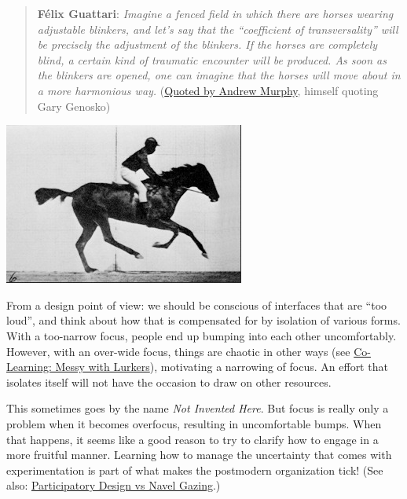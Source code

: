 \begin{quote}
\textbf{Félix Guattari}: \emph{Imagine a fenced field in which there are
horses wearing adjustable blinkers, and let's say that the ``coefficient
of transversality'' will be precisely the adjustment of the blinkers. If
the horses are completely blind, a certain kind of traumatic encounter
will be produced. As soon as the blinkers are opened, one can imagine
that the horses will move about in a more harmonious way.}
(\href{http://nine.fibreculturejournal.org/}{Quoted by Andrew Murphy},
himself quoting Gary Genosko)
\end{quote}

\begin{center}
\includegraphics[width=.85\textwidth]{../pictures/horse.jpg}
\end{center}

From a design point of view: we should be conscious of interfaces that
are ``too loud'', and think about how that is compensated for by
isolation of various forms. With a too-narrow focus, people end up
bumping into each other uncomfortably. However, with an over-wide focus,
things are chaotic in other ways (see
\href{http://peeragogy.org/practice/antipatterns/co-learning-messy-with-lurkers/}{Co-Learning:
Messy with Lurkers}), motivating a narrowing of focus. An effort that
isolates itself will not have the occasion to draw on other resources.

This sometimes goes by the name \emph{Not Invented Here}. But focus is
really only a problem when it becomes overfocus, resulting in
uncomfortable bumps. When that happens, it seems like a good reason to
try to clarify how to engage in a more fruitful manner. Learning how to
manage the uncertainty that comes with experimentation is part of what
makes the postmodern organization tick! (See also:
\href{http://peeragogy.org/antipatterns/navel-gazing/}{Participatory
Design vs Navel Gazing}.)
